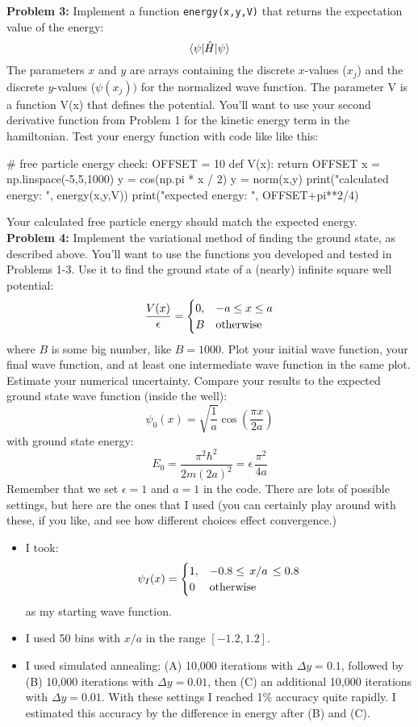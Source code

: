 \documentclass[12pt]{article}
\begin{document}
\noindent
{\bf Problem 3:}  Implement a function {\tt energy(x,y,V)} that returns the expectation value of the energy:
$$\braket{\psi|\hat{H}|\psi}$$
The parameters $x$ and $y$ are arrays containing the discrete $x$-values ($x_j$) and the discrete $y$-values ($\psi(x_j))$ for the normalized wave function.  The parameter V is a function V(x) that defines the potential. You'll want to use your second derivative function from Problem 1 for the kinetic energy term in the hamiltonian.  Test your energy function with code like like this:
\begin{python}
# free particle energy check:
OFFSET = 10
def V(x):
    return OFFSET
x  = np.linspace(-5,5,1000)
y  = cos(np.pi * x / 2)
y = norm(x,y)
print("calculated energy: ", energy(x,y,V))
print("expected energy:   ", OFFSET+pi**2/4)
\end{python}
Your calculated free particle energy should match the expected energy.\\[5pt]

\noindent
{\bf Problem 4:}  Implement the variational method of finding the ground state, as described above.  You'll want to use the functions you developed and tested in Problems 1-3.  Use it to find the ground state of a (nearly) infinite square well potential:
$$\frac{V(x)}{\epsilon} = \begin{cases}
0, & -a \leq x \leq a \\
B     & {\rm otherwise} \\
\end{cases}
$$
where $B$ is some big number, like $B=1000$.  Plot your initial wave function, your final wave function, and at least one intermediate wave function in the same plot. Estimate your numerical uncertainty.  Compare your results to the expected ground state wave function (inside the well):
$$\psi_0(x) = \sqrt{\frac{1}{a}}\cos\left(\frac{\pi x}{2 a}\right)$$
with ground state energy:
$$E_0 = \frac{\pi^2 \hbar^2}{2m(2a)^2} = \epsilon \, \frac{\pi^2}{4a} $$
Remember that we set $\epsilon=1$ and $a=1$ in the code.  
There are lots of possible settings, but here are the ones that I used 
(you can certainly play around with these, if you like, and see how different choices effect convergence.)
\begin{itemize}
\item I took:
$$\psi_I(x) = \begin{cases}
1, & -0.8 \leq \, x/a \, \leq 0.8 \\
0     & {\rm otherwise} \\
\end{cases}
$$
as my starting wave function.
\item I used 50 bins with $x/a$ in the range $[-1.2, 1.2]$.
\item I used simulated annealing:  (A) 10,000 iterations with $\Delta y = 0.1$, followed by (B) 10,000 iterations with $\Delta y = 0.01$, then (C) an additional 10,000 iterations with $\Delta y = 0.01$.  With these settings I reached 1\% accuracy quite rapidly.  I estimated this accuracy by the difference in energy after (B) and (C).
\end{itemize}
\end{document}
